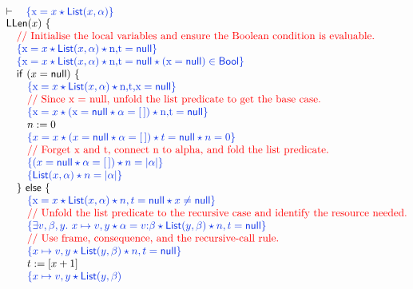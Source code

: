\documentclass[11pt]{article}
\newcommand{\List}{\mathsf{List}}
\newcommand{\LLen}{\mathsf{LLen}}
\newcommand{\Bool}{\mathsf{Bool}}
\newcommand{\Null}{\mathsf{null}}
\newcommand{\blueassn}[1]{\textcolor{blue}{#1}}
\begin{document}
{\small
\[
\begin{array}{@{}l@{}}
\vdash\quad \blueassn{\{\text{x} = x \star \List(x,\alpha)\}} \\[-0.2ex]
\LLen(x)\ \{ \\
\quad \text{\textcolor{red}{// Initialise the local variables and ensure the Boolean condition is evaluable.}} \\
\quad \blueassn{\{\text{x} = x \star \List(x,\alpha) \star \text{n,t} = \Null\}} \\
\quad \blueassn{\{\text{x} = x \star \List(x,\alpha) \star \text{n,t} = \Null
  \star (\text{x} = \Null) \in \Bool\}} \\
\quad \mathsf{if}\ (x = \Null)\ \{ \\
\qquad \blueassn{\{\text{x} = x \star \List(x,\alpha) \star \text{n,t,x} = \Null\}} \\
\qquad \text{\textcolor{red}{// Since x = null, unfold the list predicate to get the base case.}} \\
\qquad \blueassn{\{\text{x} = x \star (\text{x} = \Null \star \alpha = [\,])
  \star \text{n,t} = \Null\}} \\
\qquad n := 0 \\
\qquad \blueassn{\{x = x \star (x = \Null \star \alpha = [\,])
  \star t = \Null \star n = 0\}} \\
\qquad \text{\textcolor{red}{// Forget x and t, connect n to alpha, and fold the list predicate.}} \\
\qquad \blueassn{\{(x = \Null \star \alpha = [\,]) \star n = |\alpha|\}} \\
\qquad \blueassn{\{\List(x,\alpha) \star n = |\alpha|\}} \\
\quad \}\ \mathsf{else}\ \{ \\
\qquad \blueassn{\{\text{x} = x \star \List(x,\alpha) \star n,t = \Null
  \star x \ne \Null\}} \\
\qquad \text{\textcolor{red}{// Unfold the list predicate to the recursive case and identify the resource needed.}} \\
\qquad \blueassn{\{\exists v,\beta,y.\ x \mapsto v,y
  \star \alpha = v{:}\beta \star \List(y,\beta) \star n,t = \Null\}} \\
\qquad \text{\textcolor{red}{// Use frame, consequence, and the recursive-call rule.}} \\
\qquad \blueassn{\{x \mapsto v,y \star \List(y,\beta) \star n,t = \Null\}} \\
\qquad t := [x + 1] \\
\qquad \blueassn{\{x \mapsto v,y \star \List(y,\beta)
}
\end{array}\]}
\end{document}
